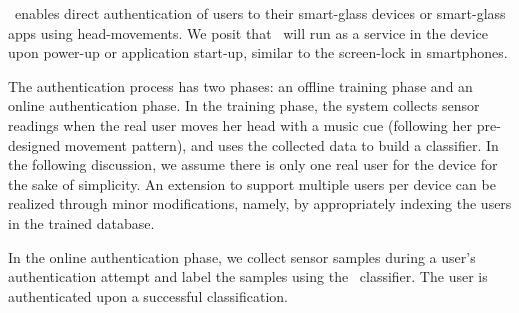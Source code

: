 \systemname~enables direct authentication of users to their smart-glass devices or smart-glass apps using
head-movements. We posit that \systemname~will run as a service in the device upon power-up or application start-up,
similar to the screen-lock in smartphones.  %


The authentication process has two phases: an offline training phase and an
online authentication phase. In the training phase, the system
collects sensor readings when the real user moves her head with a music cue (following her pre-designed movement pattern), and uses the collected data to
build a classifier. In the following discussion, we assume there is only
one real user for the device for the sake of simplicity. An extension to
support multiple users per device can be realized through minor modifications,
namely, by appropriately indexing the users in the trained database.

In the online authentication phase, we collect sensor samples during a user's authentication attempt and label the samples using the \systemname~classifier.
The user is authenticated upon a successful classification.

